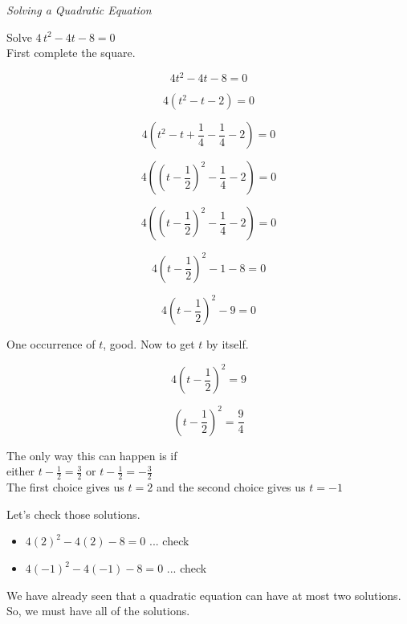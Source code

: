 \documentclass{ximera}
\begin{document}
\begin{example} \textit{Solving a Quadratic Equation}

Solve $4 \, t^2 - 4 t - 8 = 0$ \\


First complete the square.



\[ 4 t^2 -  4 t - 8 = 0 \]

\[ 4 (t^2 - t - 2) = 0 \]

\[ 4 (t^2 - t + \frac{1}{4} - \frac{1}{4} - 2) = 0 \]


\[ 4 \left(\left(t - \frac{1}{2}\right)^2 - \frac{1}{4} - 2\right) = 0 \]


\[ 4 \left(\left(t - \frac{1}{2}\right)^2 - \frac{1}{4} - 2\right) = 0 \]

\[ 4 \left(t - \frac{1}{2}\right)^2 - 1 - 8 = 0 \]

\[ 4 \left(t - \frac{1}{2}\right)^2 - 9 = 0 \]


One occurrence of $t$, good. Now to get $t$ by itself.


\[ 4 \left(t - \frac{1}{2}\right)^2 = 9  \]

\[  \left(t - \frac{1}{2}\right)^2 = \frac{9}{4}  \]

The only way this can happen is if \\



either   $t - \frac{1}{2} = \frac{3}{2}$  or  $t - \frac{1}{2} = -\frac{3}{2}$ \\

The first choice gives us $t = 2$ and the second choice gives us $t = -1$



Let's check those solutions.

\begin{itemize}
\item $4 (2)^2 - 4 (2) - 8 = 0$ ... check
\item $4 (-1)^2 - 4 (-1) - 8 = 0$ ... check
\end{itemize}



We have already seen that a quadratic equation can have at most two solutions.  So, we must have all of the solutions.



\end{example}
\end{document}
